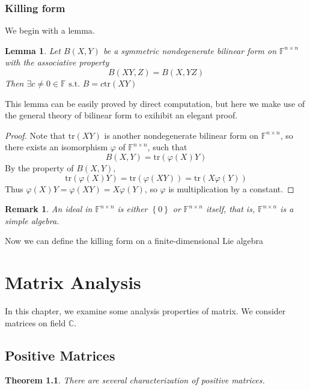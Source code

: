 \documentclass{book}
\newtheorem{theorem}{Theorem}[section]
\newtheorem{lemma}{Lemma}[section]
\newtheorem*{remark}{Remark}
\theoremstyle{definition}
\begin{document}
\subsection{Killing form}
We begin with a lemma.
\begin{lemma}
Let $B(X,Y)$ be a symmetric nondegenerate bilinear form on $\mathbb{F}^{n\times n}$ with the associative property \[B(XY,Z)=B(X,YZ)\]
Then $\exists c\ne 0\in \mathbb{F} \text{ s.t. }B=c\text{tr}(XY)$
\end{lemma}
This lemma can be easily proved by direct computation, but here we make use of the general theory of bilinear form to exihibit an elegant proof.
\begin{proof}
Note that $\text{tr}(XY)$ is another nondegenerate bilinear form on $\mathbb{F}^{n\times n}$, so there exists an isomorphism $\varphi$ of $\mathbb{F}^{n\times n}$, such that\[B(X,Y)=\text{tr}(\varphi(X)Y)\]
By the property of $B(X,Y)$,\[\text{tr}(\varphi(X)Y)=\text{tr}
(\varphi(XY))=\text{tr}(X\varphi(Y))\]
Thus $\varphi(X)Y=\varphi(XY)=X\varphi(Y)$, so $\varphi$ is multiplication by a constant.
\end{proof}
\begin{remark}
An ideal in $\mathbb{F}^{n\times n}$ is either $\left \{ 0 \right \} $ or  $\mathbb{F}^{n\times n}$ itself, that is,  $\mathbb{F}^{n\times n}$ is a simple algebra.
\end{remark}
Now we can define the killing form on a finite-dimensional Lie algebra


\chapter{Matrix Analysis}
In this chapter, we examine some analysis properties of matrix. We consider matrices on field $\mathbb{C}$.

\section{Positive Matrices}
\begin{theorem}
    There are several characterization of positive matrices.\par

\end{theorem}
\end{document}
